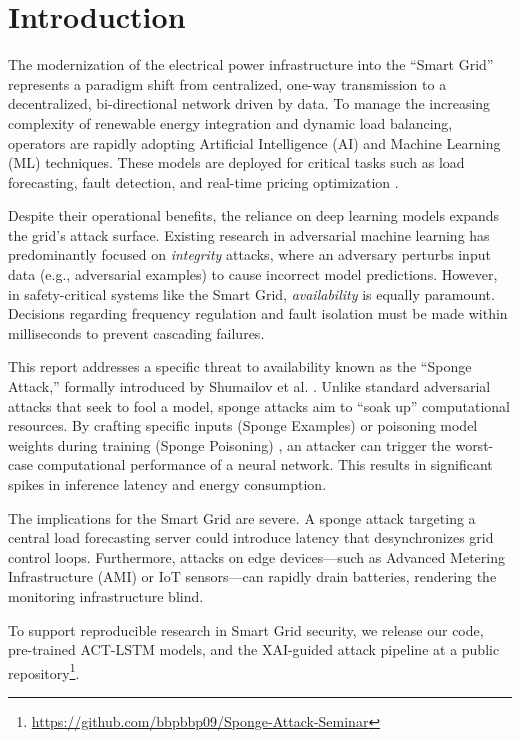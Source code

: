 \section{Introduction}
The modernization of the electrical power infrastructure into the ``Smart Grid'' represents a paradigm shift from centralized, one-way transmission to a decentralized, bi-directional network driven by data. To manage the increasing complexity of renewable energy integration and dynamic load balancing, operators are rapidly adopting Artificial Intelligence (AI) and Machine Learning (ML) techniques. These models are deployed for critical tasks such as load forecasting, fault detection, and real-time pricing optimization \cite{sanchez2024attacking}.

Despite their operational benefits, the reliance on deep learning models expands the grid's attack surface. Existing research in adversarial machine learning has predominantly focused on \textit{integrity} attacks, where an adversary perturbs input data (e.g., adversarial examples) to cause incorrect model predictions. However, in safety-critical systems like the Smart Grid, \textit{availability} is equally paramount. Decisions regarding frequency regulation and fault isolation must be made within milliseconds to prevent cascading failures.

This report addresses a specific threat to availability known as the ``Sponge Attack,'' formally introduced by Shumailov et al. \cite{shumailov2021sponge}. Unlike standard adversarial attacks that seek to fool a model, sponge attacks aim to ``soak up'' computational resources. By crafting specific inputs (Sponge Examples) \cite{cina2022sponge} or poisoning model weights during training (Sponge Poisoning) \cite{cina2022sponge}, an attacker can trigger the worst-case computational performance of a neural network. This results in significant spikes in inference latency and energy consumption.

The implications for the Smart Grid are severe. A sponge attack targeting a central load forecasting server could introduce latency that desynchronizes grid control loops. Furthermore, attacks on edge devices—such as Advanced Metering Infrastructure (AMI) or IoT sensors—can rapidly drain batteries, rendering the monitoring infrastructure blind.

To support reproducible research in Smart Grid security, we release our code, pre-trained ACT-LSTM models, and the XAI-guided attack pipeline at a public repository\footnote{\url{https://github.com/bbpbbp09/Sponge-Attack-Seminar}}.

